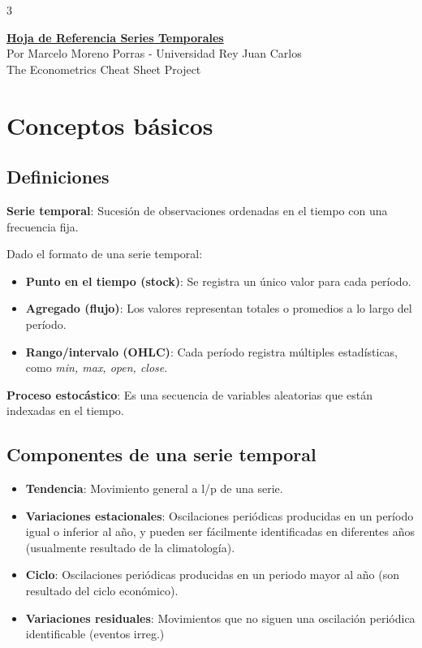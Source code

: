 \documentclass[10pt, a4paper, landscape]{article}
\begin{document}
\begin{multicols}{3}

\begin{center}
	\textbf{\LARGE \href{https://github.com/marcelomijas/econometrics-cheatsheet}{Hoja de Referencia Series Temporales}} \\
	{\footnotesize Por Marcelo Moreno Porras - Universidad Rey Juan Carlos} \\
	{\footnotesize The Econometrics Cheat Sheet Project}
\end{center}

\section*{Conceptos básicos}

\subsection*{Definiciones}

\textbf{Serie temporal}: Sucesión de observaciones ordenadas en el tiempo con una frecuencia fija.

Dado el formato de una serie temporal:

\begin{itemize}[leftmargin=*]
	\item \textbf{Punto en el tiempo (stock)}: Se registra un único valor para cada período.
	\item \textbf{Agregado (flujo)}: Los valores representan totales o promedios a lo largo del período.
	\item \textbf{Rango/intervalo (OHLC)}: Cada período registra múltiples estadísticas, como \textit{min, max, open, close}.
\end{itemize}

\textbf{Proceso estocástico}: Es una secuencia de variables aleatorias que están indexadas en el tiempo.

\subsection*{Componentes de una serie temporal}

\begin{itemize}[leftmargin=*]
	\item \textbf{Tendencia}: Movimiento general a l/p de una serie.
	\item \textbf{Variaciones estacionales}: Oscilaciones periódicas producidas en un período igual o inferior al año, y pueden ser fácilmente identificadas en diferentes años (usualmente resultado de la climatología).
	\item \textbf{Ciclo}: Oscilaciones periódicas producidas en un periodo mayor al año (son resultado del ciclo económico).
	\item \textbf{Variaciones residuales}: Movimientos que no siguen una oscilación periódica identificable (eventos irreg.)
\end{itemize}


\end{multicols}
\end{document}
